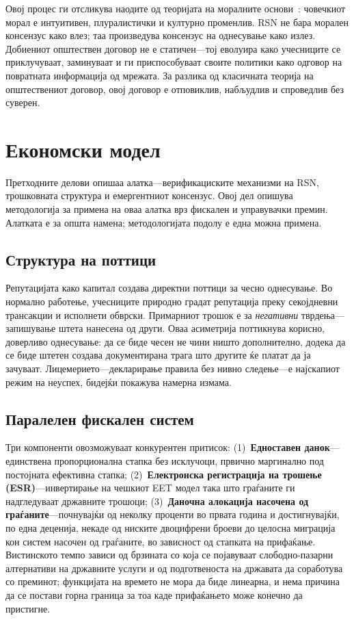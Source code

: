 \documentclass[11pt,a4paper,twocolumn]{article}
\begin{document}
Овој процес ги отсликува наодите од теоријата на моралните основи~\cite{haidt2012}: човечкиот морал е интуитивен, плуралистички и културно променлив. RSN не бара морален консензус како влез; таа произведува консензус на однесување како излез. Добиениот општествен договор не е статичен---тој еволуира како учесниците се приклучуваат, заминуваат и ги приспособуваат своите политики како одговор на повратната информација од мрежата. За разлика од класичната теорија на општествениот договор, овој договор е отповиклив, набљудлив и спроведлив без суверен.

\section{Економски модел}

Претходните делови опишаа алатка---верификациските механизми на RSN, трошковната структура и емергентниот консензус. Овој дел опишува методологија за примена на оваа алатка врз фискален и управувачки премин. Алатката е за општа намена; методологијата подолу е една можна примена.

\subsection{Структура на поттици}

Репутацијата како капитал создава директни поттици за чесно однесување. Во нормално работење, учесниците природно градат репутација преку секојдневни трансакции и исполнети обврски. Примарниот трошок е за \emph{негативни} тврдења---запишување штета нанесена од други. Оваа асиметрија поттикнува корисно, доверливо однесување: да се биде чесен не чини ништо дополнително, додека да се биде штетен создава документирана трага што другите ќе платат да ја зачуваат. Лицемерието---декларирање правила без нивно следење---е најскапиот режим на неуспех, бидејќи покажува намерна измама.

\subsection{Паралелен фискален систем}

Три компоненти овозможуваат конкурентен притисок: (1)~\textbf{Едноставен данок}---единствена пропорционална стапка без исклучоци, првично маргинално под постојната ефективна стапка; (2)~\textbf{Електронска регистрација на трошење (ESR)}---инвертирање на чешкиот EET модел така што граѓаните ги надгледуваат државните трошоци; (3)~\textbf{Даночна алокација насочена од граѓаните}---почнувајќи од неколку проценти во првата година и достигнувајќи, по една деценија, некаде од ниските двоцифрени броеви до целосна миграција кон систем насочен од граѓаните, во зависност од стапката на прифаќање. Вистинското темпо зависи од брзината со која се појавуваат слободно-пазарни алтернативи на државните услуги и од подготвеноста на државата да соработува со преминот; функцијата на времето не мора да биде линеарна, и нема причина да се постави горна граница за тоа каде прифаќањето може конечно да пристигне.
\end{document}
